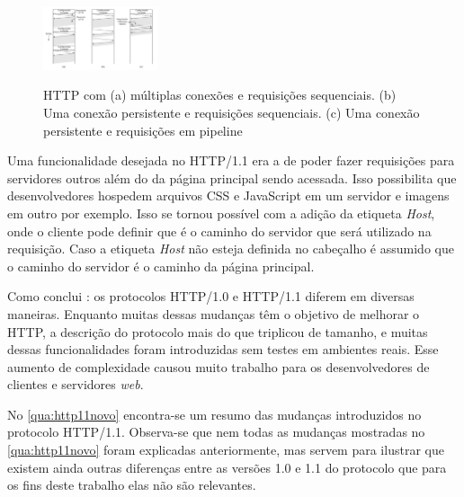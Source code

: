 \begin{figure}[!htb]
    \centering
    \caption{HTTP com (a) múltiplas conexões e requisições sequenciais. (b) Uma conexão persistente e requisições sequenciais. (c) Uma conexão persistente e requisições em pipeline}
    \includegraphics[width=0.3\textwidth]{./04-figuras/fund-teorica/httpconexaopersistente}
    \label{fig:httpconexaopersistente}
\end{figure}


Uma funcionalidade desejada no HTTP/1.1 era a de poder fazer requisições para servidores outros além do da página principal sendo acessada. Isso possibilita que desenvolvedores hospedem arquivos CSS e JavaScript em um servidor e imagens em outro por exemplo. Isso se tornou possível com a adição da etiqueta \textit{Host}, onde o cliente pode definir que é o caminho do servidor que será utilizado na requisição. Caso a etiqueta \textit{Host} não esteja definida no cabeçalho é assumido que o caminho do servidor é o caminho da página principal.

Como conclui \cite{KeyDifferencesHTTP}: os protocolos HTTP/1.0 e HTTP/1.1 diferem em diversas maneiras. Enquanto muitas dessas mudanças têm o objetivo de melhorar o HTTP, a descrição do protocolo mais do que triplicou de tamanho, e muitas dessas funcionalidades foram introduzidas sem testes em ambientes reais. Esse aumento de complexidade causou muito trabalho para os desenvolvedores de clientes e servidores \textit{web}. 

No \autoref{qua:http11novo} encontra-se um resumo das mudanças introduzidos no protocolo HTTP/1.1. Observa-se que nem todas as mudanças mostradas no \autoref{qua:http11novo} foram explicadas anteriormente, mas servem para ilustrar que existem ainda outras diferenças entre as versões 1.0 e 1.1 do protocolo que para os fins deste trabalho elas não são relevantes.

